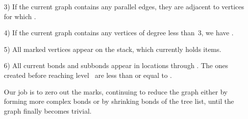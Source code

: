 \smallskip\item{3)} If the current graph contains any parallel edges,
they are adjacent to vertices  for which .

\smallskip\item{4)} If the current graph contains any vertices  of
degree
less than~3, we have .

\smallskip\item{5)} All marked vertices appear on the stack, which currently
holds  items.

\smallskip\item{6)} All current bonds and subbonds appear in locations
 through . The ones
created before
reaching level~ are less than or equal to .

\smallskip\noindent
Our job is to zero out the marks, continuing to reduce the graph
either by forming more complex bonds or by shrinking bonds of
the tree list, until the graph finally becomes trivial.

